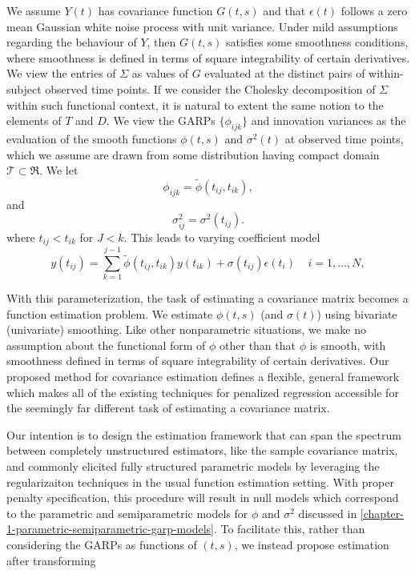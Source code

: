 \documentclass[12pt]{article}
\theoremstyle{definition}
\begin{document}
We assume $Y\left(t\right)$ has covariance function $G\left(t,s\right)$ and that $\epsilon\left(t\right)$ follows a zero mean Gaussian white noise process with unit variance. Under mild assumptions regarding the behaviour of $Y$, then $G\left(t,s\right)$ satisfies some smoothness conditions, where smoothness is defined in terms of square integrability of certain derivatives. We view the entries of $\Sigma$ as values of $G$ evaluated at the distinct pairs of within-subject observed time points. 
\bigskip
If we consider the Cholesky decomposition of $\Sigma$ within such functional context, it is natural to extent the same notion to the elements of $T$ and $D$. We view the GARPs $\lbrace \phi_{ijk} \rbrace$ and innovation variances as the evaluation of the smooth functions $\phi\left(t,s\right)$ and $\sigma^2\left(t\right)$ at observed time points, which we assume  are drawn from some distribution having compact domain $\mathcal{T} \subset \Re$. We let 
\[
\phi_{ijk} = \tilde{\phi}\left(t_{ij},t_{ik}\right), 
\]
and
\[
\sigma_{ij}^2 = \sigma^2\left(t_{ij}\right).
\]
where $t_{ij} < t_{ik}$ for $J < k$. This leads to varying coefficient model
\begin{equation}   
y\left(t_{ij} \right)  = \sum_{k=1}^{j-1} \tilde{\phi}\left(t_{ij} ,t_{ik}\right) y\left(t_{ik}\right) + \sigma\left(t_{ij}\right)\epsilon\left({t_i}\right) \;\;\;\; i=1,\dots, N, 
\label{eq:MyModel} 
\end{equation}
\noindent


With this parameterization, the task of estimating a covariance matrix becomes a function estimation problem. We estimate $\phi\left(t,s\right)$ (and $\sigma\left(t \right)$) using bivariate (univariate) smoothing. Like other nonparametric situations, we make no assumption about the functional form of $\phi$ other than that $\phi$ is smooth, with smoothness defined in terms of square integrability of certain derivatives. Our proposed method for covariance estimation defines a flexible, general framework which makes all of the existing techniques for penalized regression accessible for the seemingly far different task of estimating a covariance matrix.

\bigskip

Our intention is to design the estimation framework that can span the spectrum between completely unstructured estimators, like the sample covariance matrix, and commonly elicited fully structured parametric models by leveraging the regularizaiton techniques in the usual function estimation setting. With proper penalty specification, this procedure will result in null models which correspond to the parametric and semiparametric models for $\phi$ and $\sigma^2$ discussed in \ref{chapter-1-parametric-semiparametric-garp-models}. To facilitate this, rather than considering the GARPs as functions of $\left(t,s\right)$, we instead propose estimation after transforming
\end{document}
